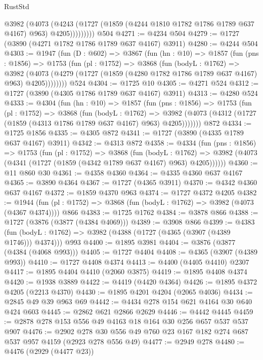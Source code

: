 \begin{lexlean}{RustStd}
\begin{coremodule}
              @3982
                (@4073
                  (@4243
                    (@1727 (@1859 (@4244 @1810 @1782 @1786 @1789 @637 @4167) @963) @4205)))))))))
    @504
@4271 := @4234 @504
@4279 := @1727 (@3890 (@4271 @1782 @1786 @1789 @637 @4167) @3911)
@4280 := @4244 @504
@4303 := @1947
    (fun (D : @602) =>
    @3867
      (fun (hn : @10) =>
      @1857
        (fun (pns : @1856) =>
        @1753
          (fun (pl : @1752) =>
          @3868
            (fun (bodyL : @1762) =>
            @3982
              (@4073 (@4279 (@1727 (@1859 (@4280 @1782 @1786 @1789 @637 @4167) @963) @4205))))))))
    @524
@4304 := @1725 @10
@4305 := @4271 @524
@4312 := @1727 (@3890 (@4305 @1786 @1789 @637 @4167) @3911)
@4313 := @4280 @524
@4333 := @4304
    (fun (hn : @10) =>
    @1857
      (fun (pns : @1856) =>
      @1753
        (fun (pl : @1752) =>
        @3868
          (fun (bodyL : @1762) =>
          @3982 (@4073 (@4312 (@1727 (@1859 (@4313 @1786 @1789 @637 @4167) @963) @4205)))))))
    @872
@4334 := @1725 @1856
@4335 := @4305 @872
@4341 := @1727 (@3890 (@4335 @1789 @637 @4167) @3911)
@4342 := @4313 @872
@4358 := @4334
    (fun (pns : @1856) =>
    @1753
      (fun (pl : @1752) =>
      @3868
        (fun (bodyL : @1762) =>
        @3982 (@4073 (@4341 (@1727 (@1859 (@4342 @1789 @637 @4167) @963) @4205))))))
@4360 := @11 @860 @30
@4361 := @4358 @4360
@4364 := @4335 @4360 @637 @4167
@4365 := @3890 @4364
@4367 := @1727 (@4365 @3911)
@4370 := @4342 @4360 @637 @4167
@4372 := @1859 @4370 @963
@4374 := @1727 @4372 @4205
@4382 := @1944 (fun (pl : @1752) => @3868 (fun (bodyL : @1762) => @3982 (@4073 (@4367 @4374)))) @866
@4383 := @1725 @1762
@4384 := @3878 @866
@4388 := @1727 (@3876 (@3877 (@4384 @4069)))
@4389 := @3908 @866
@4399 := @4383
    (fun (bodyL : @1762) => @3982 (@4388 (@1727 (@4365 (@3907 (@4389 @1746))) @4374)))
    @993
@4400 := @1895 @3981
@4404 := @3876 (@3877 (@4384 (@4068 @993)))
@4405 := @1727 @4404
@4408 := @4365 (@3907 (@4389 @993))
@4410 := @1727 @4408 @4374
@4413 := @4400 (@4405 @4410) @2307
@4417 := @1895 @4404 @4410 (@2060 @3875)
@4419 := @1895 @4408 @4374
@4420 := @1938 @3889
@4422 := @4419 (@4420 @4364)
@4426 := @1895 @4372 @4205 (@2213 @4370)
@4430 := @1895 @4201 @4204 (@2065 @4036)
@4434 := @2845 @49 @39 @963 @69
@4442 := @4434 @278 @154 @621 @4164 @30 @640 @424 @603
@4445 := @2862 @621 @2866 @2629
@4446 := @4442 @4445
@4459 := @2878 @278 @153 @556 @49 @4163 @18 @164 @30 @256 @657 @537 @537 @907
@4476 := @2902 @278 @30 @556 @49 @760 @23 @167 @182 @274 @687 @537 @957 @4159 (@2923 @278 @556 @49)
@4477 := @2949 @278
@4480 := @4476 (@2929 (@4477 @23))

\end{coremodule}
\end{lexlean}

